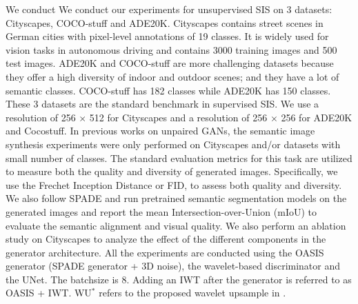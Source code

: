 \documentclass{article}
\begin{document}
    
 We conduct We conduct our experiments for unsupervised SIS on 3 datasets: Cityscapes\cite{cordts2016cityscapes}, COCO-stuff\cite{caesar2018coco} and ADE20K\cite{zhou2017scene}. Cityscapes contains street scenes in German cities with pixel-level annotations of 19 classes. It is widely used for vision tasks in autonomous driving and contains 3000 training images and 500 test images. ADE20K and COCO-stuff are more challenging datasets because they offer a high diversity of indoor and outdoor scenes; and they have a lot of semantic classes. COCO-stuff has 182 classes while ADE20K has 150 classes. These 3 datasets are the standard benchmark in supervised SIS. We use a resolution of 256 $\times$ 512 for Cityscapes and  a resolution of 256 $\times$ 256 for ADE20K and Cocostuff. In previous works on unpaired GANs, the semantic image synthesis experiments were only performed on Cityscapes and/or datasets with small number of classes. The standard evaluation metrics for this task are utilized to measure both the quality and diversity of generated images. Specifically, we use the Frechet Inception Distance or FID\cite{heuselttur2017}, to assess both quality and diversity. We also follow SPADE \cite{park2019semantic} and run pretrained semantic segmentation models \cite{yu2017dilated, chen2014semantic, xiao2018unified} on the generated images and report the mean Intersection-over-Union (mIoU) to evaluate the semantic alignment and visual quality. We also perform an ablation study on Cityscapes to analyze the effect of the different components in the generator architecture. All the experiments are conducted using the OASIS generator (SPADE generator + 3D noise), the wavelet-based discriminator and the UNet. The batchsize is 8. Adding an IWT after the generator is referred to as OASIS + IWT. WU$^{*}$ refers to the proposed wavelet upsample in \cite{Tsai2006ImageUU}. 
\end{document}
